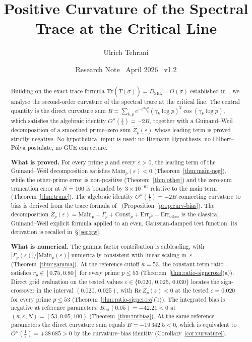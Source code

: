 \documentclass[11pt]{article}
\title{\vspace{-1.5em}\bfseries Positive Curvature of the Spectral Trace
at the Critical Line}
\author{Ulrich Tehrani}
\date{Research Note \textperiodcentered\ April 2026
      \textperiodcentered\ v1.2}
\newcommand{\Tt}{\widetilde{T}}
\newcommand{\Zt}{\widetilde{Z}}
\newcommand{\DSEL}{D_{\mathrm{SEL}}}
\begin{document}
\maketitle

\begin{abstract}
Building on the exact trace formula $\mathrm{Tr}(\Tt(\sigma))=\DSEL-O(\sigma)$
established in~\cite{Paper5}, we analyse the second-order curvature of the
spectral trace at the critical line.
The central quantity is the direct curvature sum
$B=\sum_{k,p} e^{-\varepsilon^2\gamma_k^2}(\gamma_k\log p)^2\cos(\gamma_k\log p)$,
which satisfies the algebraic identity $O''(\tfrac12)=-2B$, together with a
Guinand--Weil decomposition of a smoothed prime--zero sum $\Zt_p(\varepsilon)$
whose leading term is proved strictly negative.
No hypothetical input is used: no Riemann Hypothesis, no Hilbert--P\'olya
postulate, no GUE conjecture.

\textbf{What is proved.}
For every prime $p$ and every $\varepsilon>0$, the leading term of the
Guinand--Weil decomposition satisfies
$\mathrm{Main}_p(\varepsilon)<0$ (Theorem~\ref{thm:main-neg}), while the
other-prime error is non-positive
(Theorem~\ref{thm:other}) and the zero-sum truncation error at $N=100$
is bounded by $3\times 10^{-61}$ relative to the main term
(Theorem~\ref{thm:trunc}).
The algebraic identity $O''(\tfrac12)=-2B$ connecting curvature to bias
is derived from the trace formula of~\cite{Paper5}
(Proposition~\ref{prop:curv-bias}).
The decomposition
$\Zt_p(\varepsilon)=\mathrm{Main}_p+\Gamma_p+\mathrm{Const}_p
+\mathrm{Err}_{p^k}+\mathrm{Err}_{\mathrm{other}}$
is the classical Guinand--Weil explicit formula applied to an even,
Gaussian-damped test function; its derivation is recalled in~\S\,\ref{sec:gw}.

\textbf{What is numerical.}
The gamma factor contribution is subleading, with
$|\Gamma_p(\varepsilon)|/|\mathrm{Main}_p(\varepsilon)|$ numerically
consistent with linear scaling in~$\varepsilon$
(Theorem~\ref{thm:gamma}).
At the reference cutoff $\kappa=53$, the constant-term ratio satisfies
$r_p\in[0.75,0.80]$ for every prime $p\le 53$
(Theorem~\ref{thm:ratio-signcross}(a)).
Direct grid evaluation on the tested values
$\varepsilon\in\{0.020,\,0.025,\,0.030\}$ locates the sign-crossover
in the interval $(0.020,\,0.025)$, with
$\mathrm{Re}\,\Zt_p(\varepsilon)<0$ at the tested $\varepsilon=0.020$
for every prime $p\le 53$ (Theorem~\ref{thm:ratio-signcross}(b)).
The integrated bias is negative at reference parameters,
$B_{\mathrm{int}}(0.05)=-42.21<0$ at
$(\kappa,\varepsilon,N)=(53,0.05,100)$ (Theorem~\ref{thm:intbias}).
At the same reference parameters the direct curvature sum equals
$B=-19\,342.5<0$, which is equivalent to
$O''(\tfrac12)=+38\,685>0$ by the curvature--bias identity
(Corollary~\ref{cor:curvature}).


\end{abstract}
\end{document}

